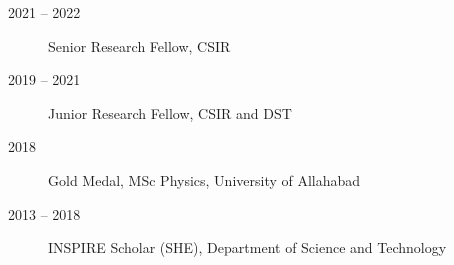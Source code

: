 \begin{description}
\item[2021 -- 2022] Senior Research Fellow, CSIR
\item[2019 -- 2021] Junior Research Fellow, CSIR and DST
\item[2018] Gold Medal, MSc Physics, University of Allahabad
\item[2013 -- 2018] INSPIRE Scholar (SHE), Department of Science and Technology
\end{description}
